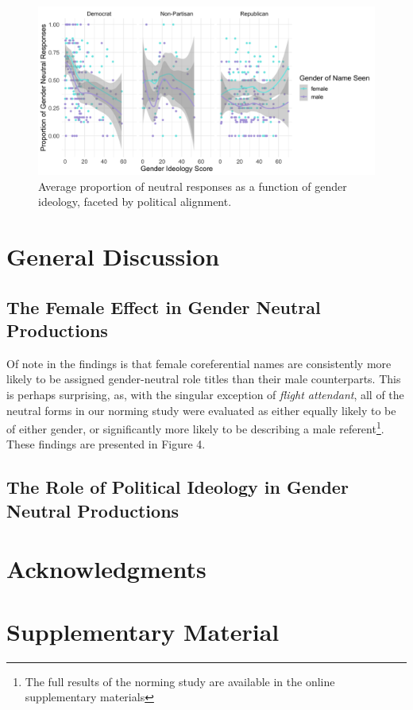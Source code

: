 \documentclass[10pt,letterpaper]{article}
\begin{document}
	\begin{figure}[ht!]
	\centering
	\includegraphics[scale=0.15]{prod_neutral_poli.png}
	\caption{Average proportion of neutral responses as a function of gender ideology, faceted by political alignment.}
	\label{prod-neutral-poli}
\end{figure}
	\section{General Discussion}
	
	\subsection{The Female Effect in Gender Neutral Productions}
	Of note in the findings is that female coreferential names are consistently more likely to be assigned gender-neutral role titles than their male counterparts. This is perhaps surprising, as, with the singular exception of \textit{flight attendant}, all of the neutral forms in our norming study were evaluated as either equally likely to be of either gender, or significantly more likely to be describing a male referent\footnote{The full results of the norming study are available in the online supplementary materials}. These findings are presented in Figure 4.
	
	\subsection{The Role of Political Ideology in Gender Neutral Productions}
	
	\section{Acknowledgments}
	
	\section{Supplementary Material}
		
	\nocite{labov1963social}
	\printbibliography
	
	
\end{document}
